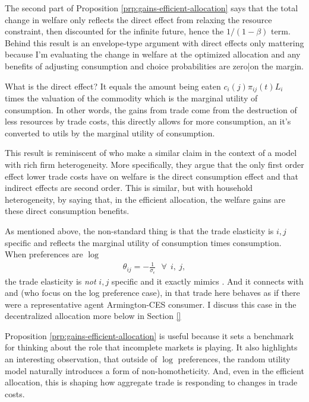 \documentclass[12pt,pdftex]{article}
\begin{document}
\begin{onehalfspacing}
The second part of Proposition \ref{prp:gains-efficient-allocation} says that the total change in welfare only reflects the direct effect from relaxing the resource constraint, then discounted for the infinite future, hence the $1/ (1-\beta)$ term. Behind this result is an envelope-type argument with direct effects only mattering because I'm evaluating the change in welfare at the optimized allocation and any benefits of adjusting consumption and choice probabilities are zero|on the margin.

What is the direct effect? It equals the amount being eaten $c_{i}(j) \pi_{ij}(t) L_i$ times the valuation of the commodity which is the marginal utility of consumption. In other words, the gains from trade come from the destruction of less resources by trade costs, this directly allows for more consumption, an it's converted to utils by the marginal utility of consumption.

This result is reminiscent of \citet{AtkesonBurstein2010} who make a similar claim in the context of a model with rich firm heterogeneity. More specifically, they argue that the only first order effect lower trade costs have on welfare is the direct consumption effect and that indirect effects are second order. This is similar, but with household heterogeneity, by saying that, in the efficient allocation, the welfare gains are these direct consumption benefits.

As mentioned above, the non-standard thing is that the trade elasticity is $i,j$ specific and reflects the marginal utility of consumption times consumption. When preferences are $\log$
\begin{align}
\theta_{ij} = -\frac{1}{\sigma_{\epsilon}} \ \ \ \forall \ \ i,\ j,
\end{align}
the trade elasticity is \textit{not} $i,j$ specific and it exactly mimics \citet{eaton2002technology}. And it connects with \citet{anderson1987ces} and \citet{anderson1992discrete} (who focus on the log preference case), in that trade here behaves as if there were a representative agent Armington-CES consumer. I discuss this case in the decentralized allocation more below in Section \ref{}

Proposition \ref{prp:gains-efficient-allocation} is useful because it sets a benchmark for thinking about the role that incomplete markets is playing. It also highlights an interesting observation, that outside of $\log$ preferences, the random utility model naturally introduces a form of non-homotheticity. And, even in the efficient allocation, this is shaping how aggregate trade is responding to changes in trade costs.



\end{onehalfspacing}
\end{document}
